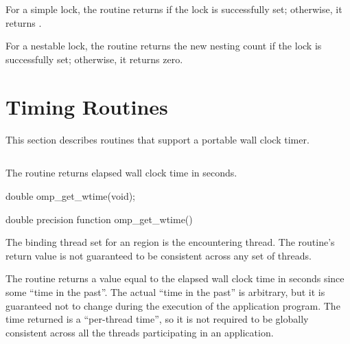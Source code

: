 For a simple lock, the  routine returns  if the lock is successfully 
set; otherwise, it returns .

For a nestable lock, the  routine returns the new nesting count 
if the lock is successfully set; otherwise, it returns zero.







\section{Timing Routines}
\label{sec:Timing Routines}
This section describes routines that support a portable wall clock timer.









\subsection{}
\label{subsec:omp_get_wtime}
\summary
The  routine returns elapsed wall clock time in seconds.

\format
\ccppspecificstart
\begin{boxedcode}
double omp\_get\_wtime(void);
\end{boxedcode}
\ccppspecificend

\fortranspecificstart
\begin{boxedcode}
double precision function omp\_get\_wtime()
\end{boxedcode}
\fortranspecificend

\binding
The binding thread set for an  region is the encountering thread. The 
routine’s return value is not guaranteed to be consistent across any set of threads.

\effect
The  routine returns a value equal to the elapsed wall clock time in 
seconds since some ``time in the past''. The actual ``time in the past'' is arbitrary, but it is 
guaranteed not to change during the execution of the application program. The time 
returned is a ``per-thread time'', so it is not required to be globally consistent across all 
the threads participating in an application.

